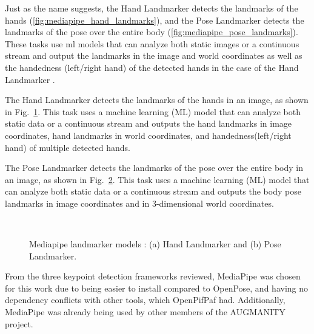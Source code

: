 
Just as the name suggests, the Hand Landmarker detects the landmarks of the hands (\autoref{fig:mediapipe_hand_landmarks}), and the Pose Landmarker detects the landmarks of the pose over the entire body (\autoref{fig:mediapipe_pose_landmarks}). These tasks use \acs{ml} models that can analyze both static images or a continuous stream and output the landmarks in the image and world coordinates as well as the handedness (left/right hand) of the detected hands in the case of the Hand Landmarker \cite{mediapipe_docs}.

The Hand Landmarker detects the landmarks of the hands in an image, as shown in Fig.~\ref{fig:mediapipe_hand_landmarks}. This task uses a machine learning (ML) model that can analyze both static data or a continuous stream and outputs the hand landmarks in image coordinates, hand landmarks in world coordinates, and handedness(left/right hand) of multiple detected hands.

The Pose Landmarker detects the landmarks of the pose over the entire body in an image, as shown in Fig.~\ref{fig:mediapipe_pose_landmarks}.  This task uses a machine learning (ML) model that can analyze both static data or a continuous stream and outputs the body pose landmarks in image coordinates and in 3-dimensional world coordinates.
\fi

\begin{figure}[ht]
    \centering
    \begin{subfigure}[b]{0.49\textwidth}
        \caption{}
        \label{fig:mediapipe_hand_landmarks}
    \end{subfigure} \
    \begin{subfigure}[b]{0.49\textwidth}
        \caption{}
        \label{fig:mediapipe_pose_landmarks}
    \end{subfigure}
    \caption[Mediapipe landmarker models: Hand Landmarker and Pose Landmarker.]{Mediapipe landmarker models \cite{mediapipe_docs}: (a) Hand Landmarker and (b) Pose Landmarker.}
    \label{fig:mediapipe_landmarks}
\end{figure}

From the three keypoint detection frameworks reviewed, MediaPipe was chosen for this work due to being easier to install compared to OpenPose, and having no dependency conflicts with other tools, which OpenPifPaf had. Additionally, MediaPipe was already being used by other members of the AUGMANITY project.

